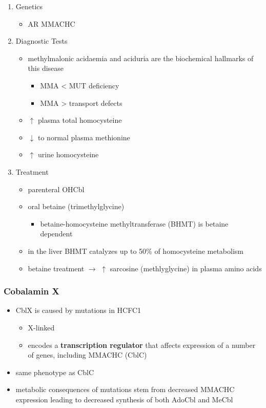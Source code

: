 \documentclass[12pt]{scrartcl}
\begin{document}
\begin{enumerate}
\item Genetics
\label{sec:org91f32c6}
\begin{itemize}
\item AR MMACHC
\end{itemize}

\item Diagnostic Tests
\label{sec:orgb51645c}
\begin{itemize}
\item methylmalonic acidaemia and aciduria are the
biochemical hallmarks of this disease
\begin{itemize}
\item MMA \textless{} MUT deficiency
\item MMA \textgreater{} transport defects
\end{itemize}
\item \(\uparrow\) plasma total homocysteine
\item \(\downarrow\) to normal plasma methionine
\item \(\uparrow\) urine homocysteine
\end{itemize}

\item Treatment
\label{sec:org842f428}
\begin{itemize}
\item parenteral OHCbl
\item oral betaine (trimethylglycine)
\begin{itemize}
\item betaine-homocysteine methyltransferase (BHMT) is betaine dependent
\end{itemize}
\end{itemize}


\begin{itemize}
\item in the liver BHMT catalyzes up to 50\% of homocysteine metabolism
\item betaine treatment \(\to\) \(\uparrow\) sarcosine (methlyglycine) in plasma amino acids
\end{itemize}
\end{enumerate}

\subsubsection{Cobalamin X}
\label{sec:org56bf7b8}
\begin{itemize}
\item CblX is caused by mutations in HCFC1
\begin{itemize}
\item X-linked
\item encodes a \textbf{transcription regulator} that affects expression of a
number of genes, including MMACHC (CblC)
\end{itemize}
\item same phenotype as CblC
\item metabolic consequences of mutations stem from decreased MMACHC
expression leading to decreased synthesis of both AdoCbl and MeCbl
\end{itemize}
\end{document}
